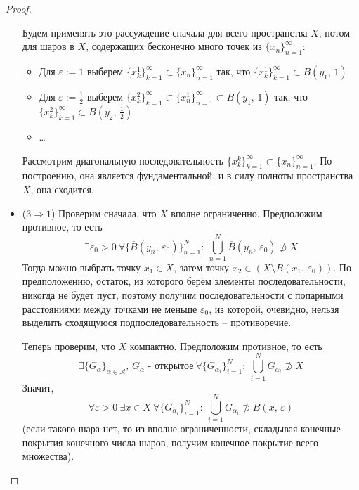 \documentclass[a4paper,12pt]{article}
\theoremstyle{plain}
\theoremstyle{definition}
\theoremstyle{remark}
\begin{document}
\begin{proof}
\begin{itemize}
		      Будем применять это рассуждение сначала для всего пространства $X$, потом для шаров в $X$, содержащих бесконечно много точек из $\{x_n\}_{n = 1}^\infty$:
		      \begin{itemize}
			      \item Для $\varepsilon := 1$ выберем $\{x_k^1\}_{k=1}^\infty \subset \{x_n\}_{n=1}^\infty$ так, что $\{x_k^1\}_{k=1}^\infty \subset B(y_1,\, 1)$
			      \item Для $\varepsilon := \frac{1}{2}$ выберем $\{x_k^2\}_{k=1}^\infty \subset \{x_n^1\}_{n=1}^\infty \subset B(y_1,\, 1)$ так, что $\{x_k^2\}_{k=1}^\infty \subset B(y_2,\, \frac{1}{2})$
			      \item \dots
		      \end{itemize}
		      Рассмотрим диагональную последовательность $\{x_k^k\}_{k=1}^\infty \subset \{x_n\}_{n=1}^\infty$. По построению, она является фундаментальной, и в силу полноты пространства $X$, она сходится.
		\item ($3 \Rightarrow 1$) Проверим сначала, что $X$ вполне ограниченно. Предположим противное, то есть
		      \[
			      \exists \varepsilon_0 > 0 \: \forall \{\overline{B}(y_n,\, \varepsilon_0)\}_{n = 1}^N :\: \bigcup_{n = 1}^N \overline{B}(y_n,\, \varepsilon_0) \not\supset X
		      \]
		      Тогда можно выбрать точку $x_1 \in X$, затем точку $x_2 \in (X \setminus B(x_1,\, \varepsilon_0))$. По предположению, остаток, из которого берём элементы последовательности, никогда не будет пуст, поэтому получим последовательности с попарными расстояниями между точками не меньше $\varepsilon_0$, из которой, очевидно, нельзя выделить сходящуюся подпоследовательность -- противоречие.

		      Теперь проверим, что $X$ компактно. Предположим противное, то есть
		      \[
			      \exists \{G_\alpha\}_{\alpha \in \mathcal{A}},\, G_\alpha \text{ - открытое} \: \forall \{G_{\alpha_i}\}_{i = 1}^N :\: \bigcup_{i = 1}^N  G_{\alpha_i} \not\supset X
		      \]
		      Значит,
		      \[
			      \forall \varepsilon > 0 \: \exists x \in X  \: \forall \{G_{\alpha_i}\}_{i = 1}^N :\: \bigcup_{i = 1}^N  G_{\alpha_i} \not\supset B (x,\, \varepsilon)
		      \]
		      (если такого шара нет, то из вполне ограниченности, складывая конечные покрытия конечного числа шаров, получим конечное покрытие всего множества).


\end{itemize}
\end{proof}
\end{document}
